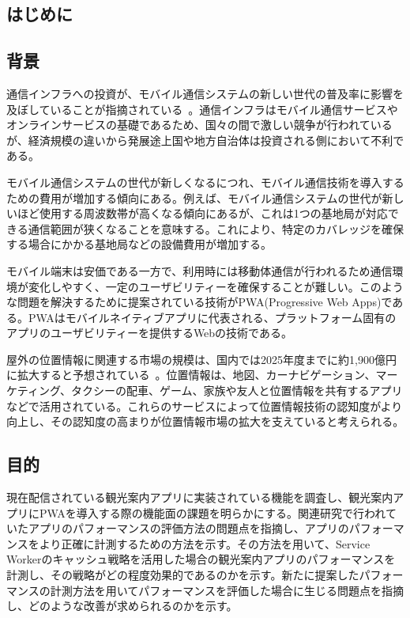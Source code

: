 \maketitle
\begin{multicols*}{2}

\section{はじめに}
\subsection{背景}
通信インフラへの投資が、モバイル通信システムの新しい世代の普及率に影響を及ぼしていることが指摘されている~\cite{Forge2020FormingA5GStrategyForDevelopingCountries}。通信インフラはモバイル通信サービスやオンラインサービスの基礎であるため、国々の間で激しい競争が行われているが、経済規模の違いから発展途上国や地方自治体は投資される側において不利である。

モバイル通信システムの世代が新しくなるにつれ、モバイル通信技術を導入するための費用が増加する傾向にある。例えば、モバイル通信システムの世代が新しいほど使用する周波数帯が高くなる傾向にあるが、これは1つの基地局が対応できる通信範囲が狭くなることを意味する。これにより、特定のカバレッジを確保する場合にかかる基地局などの設備費用が増加する。

モバイル端末は安価である一方で、利用時には移動体通信が行われるため通信環境が変化しやすく、一定のユーザビリティーを確保することが難しい。このような問題を解決するために提案されている技術がPWA(Progressive Web Apps)である。PWAはモバイルネイティブアプリに代表される、プラットフォーム固有のアプリのユーザビリティーを提供するWebの技術である。

屋外の位置情報に関連する市場の規模は、国内では2025年度までに約1,900億円に拡大すると予想されている~\cite{MIC2023InformationStatistics}。位置情報は、地図、カーナビゲーション、マーケティング、タクシーの配車、ゲーム、家族や友人と位置情報を共有するアプリなどで活用されている。これらのサービスによって位置情報技術の認知度がより向上し、その認知度の高まりが位置情報市場の拡大を支えていると考えられる。
\subsection{目的}
現在配信されている観光案内アプリに実装されている機能を調査し、観光案内アプリにPWAを導入する際の機能面の課題を明らかにする。関連研究で行われていたアプリのパフォーマンスの評価方法の問題点を指摘し、アプリのパフォーマンスをより正確に計測するための方法を示す。その方法を用いて、Service Workerのキャッシュ戦略を活用した場合の観光案内アプリのパフォーマンスを計測し、その戦略がどの程度効果的であるのかを示す。新たに提案したパフォーマンスの計測方法を用いてパフォーマンスを評価した場合に生じる問題点を指摘し、どのような改善が求められるのかを示す。

\end{multicols*}
